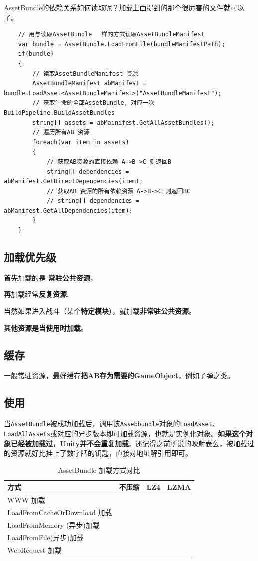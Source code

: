 \documentclass[UTF8,a4paper,12pt]{ctexbook}
\begin{document}
			AssetBundle的依赖关系如何读取呢？加载上面提到的那个很厉害的文件就可以了。
				\begin{lstlisting}
	// 用与读取AssetBundle 一样的方式读取AssetBundleManifest
	var bundle = AssetBundle.LoadFromFile(bundleManifestPath);
	if(bundle)
	{
		// 读取AssetBundleManifest 资源
		AssetBundleManifest abManifest = bundle.LoadAsset<AssetBundleManifest>("AssetBundleManifest");
		// 获取生命的全部AssetBundle, 对应一次BuildPipeline.BuildAssetBundles
		string[] assets = abMainifest.GetAllAssetBundles();
		// 遍历所有AB 资源
		foreach(var item in assets)
		{
			// 获取AB资源的直接依赖 A->B->C 则返回B
			string[] dependencies = abManifest.GetDirectDependencies(item);
			// 获取AB 资源的所有依赖资源 A->B->C 则返回BC
			// string[] dependencies = abManifest.GetAllDependencies(item);
		}
	}
				\end{lstlisting}
				
				
				
				
		\subsection{加载优先级}		
			\textbf{首先}加载的是 \textbf{常驻公共资源}，
			
			\textbf{再}加载经常\textbf{反复资源},
			
			当然如果进入战斗（某个\textbf{特定模块}），就加载\textbf{非常驻公共资源}。
			
			\textbf{其他资源是当使用时加载}。	

		
		\subsection{缓存}
			一般常驻资源，最好\underline{缓存}\textbf{把AB存为需要的GameObject}，例如子弹之类。

		\subsection{使用}
			当\verb|AssetBundle|被成功加载后，调用该\verb|Assebbundle|对象的\verb|LoadAsset|、\verb|LoadAllAssets|或对应的异步版本即可加载资源，也就是实例化对象。\textbf{如果这个对象已经被加载过，Unity并不会重复加载}，还记得之前所说的映射表么，被加载过的资源就好比挂上了数字牌的钥匙，直接对地址解引用即可。
			
			\begin{table}
				\centering
				\caption{AssetBundle 加载方式对比}
				\begin{tabular}{p{5cm}<{\centering}|p{3cm}<{\centering}|p{3cm}<{\centering}|p{3cm}<{\centering}}
					\toprule
						方式 & 不压缩 & LZ4 & LZMA\\
					\midrule
						WWW 加载 & & & \\
						LoadFromCacheOrDownload 加载 & & & \\
						LoadFromMemory (异步)加载 & & & \\
						LoadFromFile(异步)加载 & & & \\
						WebRequest 加载 & & & \\
					\bottomrule
				\end{tabular}
			\end{table}
\end{document}
